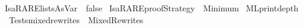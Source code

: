 \begin{isabellebody}
{\isacharbrackleft}{\kern0pt}{\isacharbrackleft}{\kern0pt}IsaRARE{\isacharunderscore}{\kern0pt}listsAsVar\ {\isacharequal}{\kern0pt}\ false{\isacharbrackright}{\kern0pt}{\isacharbrackright}{\kern0pt}\ \isanewline
{}\isamarkupfalse%
{\isacharbrackleft}{\kern0pt}{\isacharbrackleft}{\kern0pt}IsaRARE{\isacharunderscore}{\kern0pt}proofStrategy\ {\isacharequal}{\kern0pt}\ {\isachardoublequoteopen}Minimum{\isachardoublequoteclose}{\isacharbrackright}{\kern0pt}{\isacharbrackright}{\kern0pt}\ \isanewline
{}\isamarkupfalse%
{\isacharbrackleft}{\kern0pt}{\isacharbrackleft}{\kern0pt}ML{\isacharunderscore}{\kern0pt}print{\isacharunderscore}{\kern0pt}depth{\isacharequal}{\kern0pt}{}{}{}{}{}{\isacharbrackright}{\kern0pt}{\isacharbrackright}{\kern0pt}%
\isadelimdocument
%
\endisadelimdocument
%
\isatagdocument
%
\isamarkuptrue%
%
\isamarkuptrue%
%
\endisatagdocument
{\isafolddocument}%
%
\isadelimdocument
%
\endisadelimdocument
{}\isamarkupfalse%
\ {\isachardoublequoteopen}Tests{\isacharslash}{\kern0pt}mixed{\isacharunderscore}{\kern0pt}rewrites{\isachardoublequoteclose}\ {\isachardoublequoteopen}{\isachardoublequoteclose}\ {\isachardoublequoteopen}Mixed{\isacharunderscore}{\kern0pt}Rewrites{\isachardoublequoteclose}%
\isadelimdocument
%
\endisadelimdocument
%
\isatagdocument
%
\isamarkuptrue%
%
\endisatagdocument
{\isafolddocument}%
%
\isadelimdocument
%
\endisadelimdocument
%
\isadelimtheory
%
\endisadelimtheory
%
\isatagtheory
{}\isamarkupfalse%
%
\endisatagtheory
{\isafoldtheory}%
%
\isadelimtheory
%
\endisadelimtheory
%
\end{isabellebody}%
\endinput

